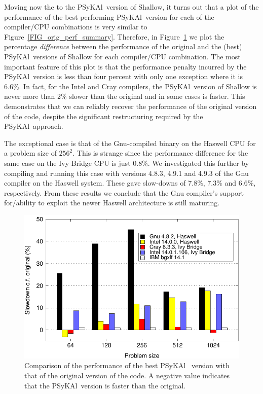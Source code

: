 \documentclass{IOS-Book-Article}
\newcommand{\psykal}{{PS}y{KA}l\ }
\begin{document}
Moving now the to the \psykal version of Shallow, it turns out that a
plot of the performance of the best performing \psykal version for
each of the compiler/CPU combinations is very similar to
Figure~\ref{FIG_orig_perf_summary}. Therefore, in
Figure~\ref{FIG_slowdown_summary} we plot the percentage {\em
  difference} between the performance of the original and the (best)
\psykal versions of Shallow for each compiler/CPU combination. The
most important feature of this plot is that the performance penalty
incurred by the \psykal version is less than four percent with only
one exception where it is 6.6\%.  In fact, for the Intel and Cray
compilers, the \psykal version of Shallow is never more than 2\%
slower than the original and in some cases is faster.  This
demonstrates that we can reliably recover the performance of the
original version of the code, despite the significant restructuring
required by the \psykal approach.

The exceptional case is that of the Gnu-compiled binary on the Haswell
CPU for a problem size of $256^2$.  This is strange since the
performance difference for the same case on the Ivy Bridge CPU is just
0.8\%. We investigated this further by compiling and running this case
with versions 4.8.3, 4.9.1 and 4.9.3 of the Gnu compiler on the
Haswell system. These gave slow-downs of 7.8\%, 7.3\% and 6.6\%,
respectively. From these results we conclude that the Gnu compiler's
support for/ability to exploit the newer Haswell architecture is still
maturing.

\begin{figure}[!t]
\centering
\includegraphics[width=120mm]{slowdown_summary}
\caption{Comparison of the performance of the best \psykal
version with that of the original version of the code. A negative value 
indicates that the \psykal version is faster than the original.}
\label{FIG_slowdown_summary}
\end{figure}
\end{document}
